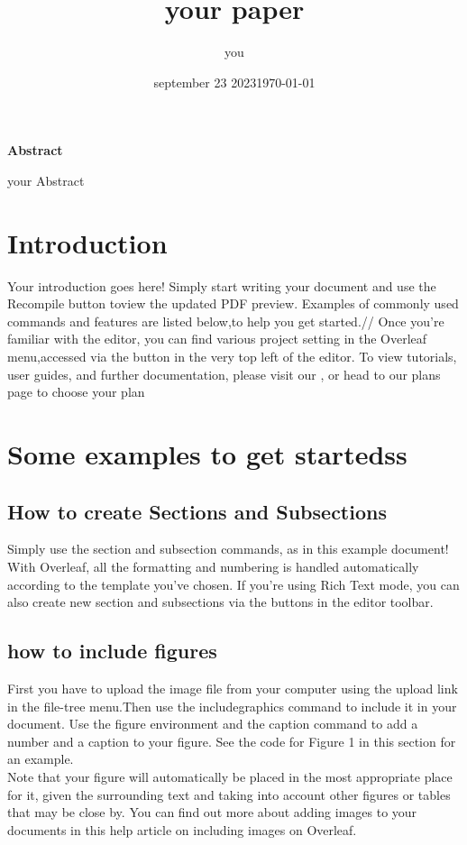 \documentclass{article}
\begin{document}
\title{your paper}
\author{you}
\date{september 23 2023}
\maketitle
\begin{center}
	\textbf{Abstract}
\end{center}
    your Abstract
	\section{Introduction}
	Your introduction goes here! Simply start writing your document and use the Recompile button toview the updated PDF preview. Examples of commonly used commands and features are listed below,to help you get started.//
	Once you’re familiar with the editor, you can find various project setting in the Overleaf menu,accessed via the button in the very top left of the editor. To view tutorials, user guides, and further documentation, please visit our , or head to our plans page to choose your plan
	\date{\today}
	\section{Some examples to get startedss}
	\subsection{How to create Sections and Subsections}
	Simply use the section and subsection commands, as in this example document! With Overleaf, all the formatting and numbering is handled automatically according to the template you’ve chosen. If you’re using Rich Text mode, you can also create new section and subsections via the buttons in the editor toolbar.
	\subsection{how to include figures}
	First you have to upload the image file from your computer using the upload link in the file-tree menu.Then use the includegraphics command to include it in your document. Use the figure environment	and the caption command to add a number and a caption to your figure. See the code for Figure 1 in this section for an example.\\
	Note that your figure will automatically be placed in the most appropriate place for it, given the surrounding text and taking into account other figures or tables that may be close by. You can find out more about adding images to your documents in this help article on including images on Overleaf.\\
	
\end{document}
